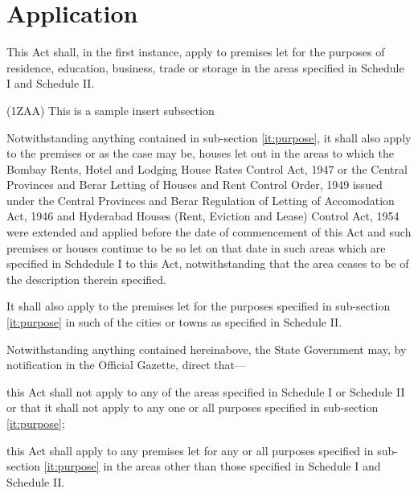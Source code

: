 \documentclass{mhact}
\begin{document}
\section{Application}
\begin{subsectionlist}[9999]
\item This Act shall, in the first instance, apply to premises let for
  the purposes of residence, education, business, trade or storage in
  the areas specified in Schedule I and Schedule II.
  \label{it:purpose}
\item[(1ZAA)] This is a sample insert subsection
\item Notwithstanding anything contained in sub-section
  \ref{it:purpose}, it shall
  also apply to the premises or as the case may be, houses let out in
  the areas to which the Bombay Rents, Hotel and Lodging House Rates
  Control Act, 1947 or the Central
  Provinces and Berar Letting of Houses and Rent Control Order, 1949
  issued under the Central Provinces and Berar Regulation of Letting
  of Accomodation Act, 1946
  and Hyderabad Houses (Rent, Eviction and Lease) Control Act, 1954
   were extended and applied before
  the date of commencement of this Act and such premises or houses
  continue to be so let on that date in such areas which are specified
  in Schdedule I to this Act, notwithstanding that the area ceases to
  be of the description therein specified.

\item It shall also apply to the premises let for the purposes
  specified in sub-section \ref{it:purpose} in such of the cities or
  towns as specified in Schedule II.
\item Notwithstanding anything
  contained hereinabove, the State Government may, by notification in
  the Official Gazette, direct that---
  \begin{clause}
  \item this Act shall not apply to any of the areas specified in Schedule I or
    Schedule II or that it shall not apply to any one or all purposes specified in
    sub-section \ref{it:purpose};
  \item this Act shall apply to any premises let for any or all
    purposes specified in sub-section \ref{it:purpose} in the areas
    other than those specified in Schedule I and Schedule II.
  \end{clause} 

\end{subsectionlist}
\end{document}
